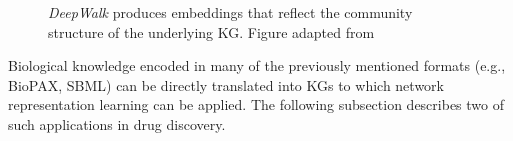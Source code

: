 \begin{figure}
    \captionsetup{format=plain}
    \caption{\textit{DeepWalk} produces embeddings that reflect the community structure of the underlying \ac{KG}. Figure adapted from ~\cite{Perozzi2014}}
    \label{fig:deepwalk_embedding}
\end{figure}

Biological knowledge encoded in many of the previously mentioned formats (e.g., \ac{BioPAX}, \ac{SBML}) can be directly translated into \ac{KG}s to which network representation learning can be applied.
The following subsection describes two of such applications in drug discovery.

